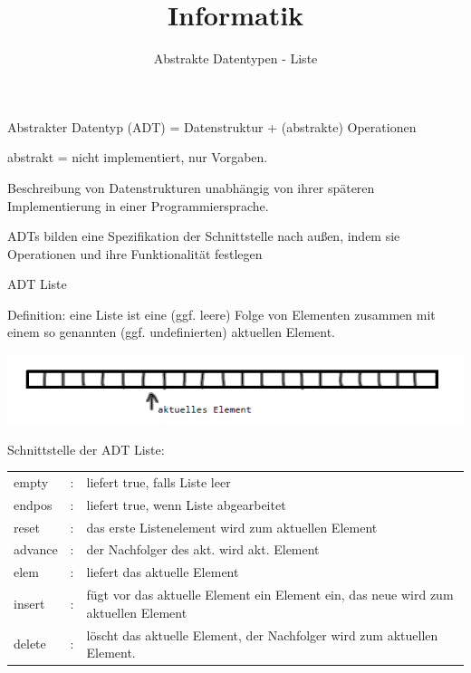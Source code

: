 \documentclass{beamer}
\begin{document}
\title{Informatik}   
\author{Abstrakte Datentypen - Liste} 
\date{}
\frame{\titlepage} 


\begin{frame}[fragile]

Abstrakter Datentyp (ADT) = Datenstruktur + (abstrakte) Operationen 

abstrakt = nicht implementiert, nur Vorgaben.  \pause

Beschreibung von Datenstrukturen unabhängig von ihrer späteren Implementierung in einer Programmiersprache.

ADTs bilden eine Spezifikation der Schnittstelle nach außen, indem sie Operationen und ihre Funktionalität festlegen
\end{frame}


\begin{frame}[fragile]

ADT Liste

Definition: eine Liste ist eine (ggf. leere) Folge von Elementen zusammen mit einem so genannten 
(ggf. undefinierten) aktuellen Element. 

\includegraphics[scale=0.6]{bild1.png}  

Schnittstelle der ADT Liste:

\tiny
\begin{tabular}{l l l}
 empty & :  & liefert true, falls Liste leer  \\
 endpos & : & liefert true, wenn Liste abgearbeitet \\
 reset & :  &  das erste Listenelement wird zum aktuellen Element \\
 advance & : &  der Nachfolger des akt. wird akt. Element \\
 elem & : & liefert das aktuelle Element \\
 insert & : & fügt vor das aktuelle Element ein Element ein, das neue wird zum aktuellen Element \\
 delete & : & löscht das aktuelle Element, der Nachfolger wird zum aktuellen Element. \\
\end{tabular}


\end{frame}
\end{document}
